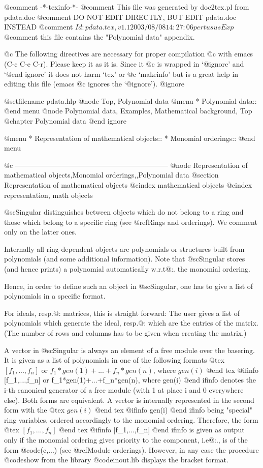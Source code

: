 @comment -*-texinfo-*-
@comment This file was generated by doc2tex.pl from pdata.doc
@comment DO NOT EDIT DIRECTLY, BUT EDIT pdata.doc INSTEAD
@comment $Id: pdata.tex,v 1.1 2003/08/08 14:27:06 pertusus Exp $
@comment this file contains the "Polynomial data" appendix.

@c The following directives are necessary for proper compilation
@c with emacs (C-c C-e C-r).  Please keep it as it is.  Since it
@c is wrapped in `@ignore' and `@end ignore' it does not harm `tex' or
@c `makeinfo' but is a great help in editing this file (emacs
@c ignores the `@ignore').
@ignore

@setfilename pdata.hlp
@node Top, Polynomial data
@menu
* Polynomial data::
@end menu
@node Polynomial data, Examples, Mathematical background, Top
@chapter Polynomial data
@end ignore

@menu
* Representation of mathematical objects::
* Monomial orderings::
@end menu

@c -----------------------------------------------------------------
@node Representation of mathematical objects,Monomial orderings,,Polynomial data
@section Representation of mathematical objects
@cindex mathematical objects
@cindex representation, math objects

@sc{Singular} distinguishes between objects which do not belong to a ring
and those which belong to a specific ring (see @ref{Rings and orderings}).
We comment only on the latter ones.

Internally all ring-dependent objects are polynomials or structures built from
polynomials (and some additional information).
Note that @sc{Singular} stores (and hence prints) a polynomial automatically
w.r.t@:. the monomial ordering.

Hence, in order to define such an object in @sc{Singular},
one has to give a list of polynomials in a specific format.

For ideals, resp.@: matrices, this is straight forward:
The user gives a list of polynomials
which generate the ideal, resp.@: which are the entries of the matrix.
(The number of rows and columns has to be given when creating the matrix.)

A vector  in @sc{Singular} is always an element of a free module over the
basering. It is given as a list of polynomials in one of the following
formats
@tex
$[f_1,...,f_n]$ or $f_1*gen(1)+...+f_n*gen(n)$, where $gen(i)$
@end tex
@ifinfo
[f_1,...,f_n] or f_1*gen(1)+...+f_n*gen(n), where gen(i)
@end ifinfo
denotes the i-th canonical generator of a free module (with 1 at place i and
0 everywhere else).
Both forms are equivalent. A vector is internally represented in
the second form with the
@tex
$gen(i)$
@end tex
@ifinfo
gen(i)
@end ifinfo
being "special" ring variables, ordered accordingly to the monomial ordering.
Therefore, the form
@tex
$[f_1,...,f_n]$
@end tex
@ifinfo
[f_1,...,f_n]
@end ifinfo
is given as output only if the monomial ordering gives priority to the
component, i.e@:., is of the form @code{(c,...)} (see @ref{Module
orderings}).  However, in any case the procedure @code{show} from the
library @code{inout.lib} displays the bracket format.

